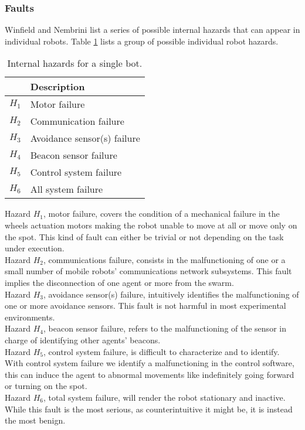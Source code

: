 \documentclass[../../Thesis.tex]{subfiles}
\begin{document}
		\subsubsection{Faults}
			Winfield and Nembrini \cite{Winfield2006} list a series of possible internal hazards that can appear in individual robots. Table \ref{tab:fault_list} lists a group of possible individual robot hazards.
			\begin{table}
				\centering
				\begin{tabular}{|l|l|}
					\hline
					\rowcolor{bluepoli!40}
					\multicolumn{1}{|c|}{\textbf{Harzard}} & \textbf{Description} \\ 
					\hline
					$H_1$ & Motor failure \\
					$H_2$ & Communication failure \\
					$H_3$ & Avoidance sensor(s) failure \\
					$H_4$ & Beacon sensor failure \\
					$H_5$ & Control system failure \\
					$H_6$ & All system failure \\
					\hline
				\end{tabular}
				\caption{Internal hazards for a single bot.}
				\label{tab:fault_list}
			\end{table}
			Hazard $H_1$, motor failure, covers the condition of a mechanical failure in the wheels actuation motors making the robot unable to move at all or move only on the spot. This kind of fault can either be trivial or not depending on the task under execution. \\
			Hazard $H_2$, communications failure, consists in the malfunctioning of one or a small number of mobile robots' communications network subsystems. This fault implies the disconnection of one agent or more from the swarm. \\
			Hazard $H_3$, avoidance sensor(s) failure,  intuitively identifies the malfunctioning of one or more avoidance sensors. This fault is not harmful in most experimental environments. \\
			Hazard $H_4$, beacon sensor failure, refers to the malfunctioning of the sensor in charge of identifying other agents' beacons. \\
			Hazard $H_5$, control system failure, is difficult to characterize and to identify. With control system failure we identify a malfunctioning in the control software, this can induce the agent to abnormal movements like indefinitely going forward or turning on the spot. \\
			Hazard $H_6$, total system failure, will render the robot stationary and inactive. While this fault is the most serious, as counterintuitive it might be, it is instead the most benign. \\
		
\end{document}

